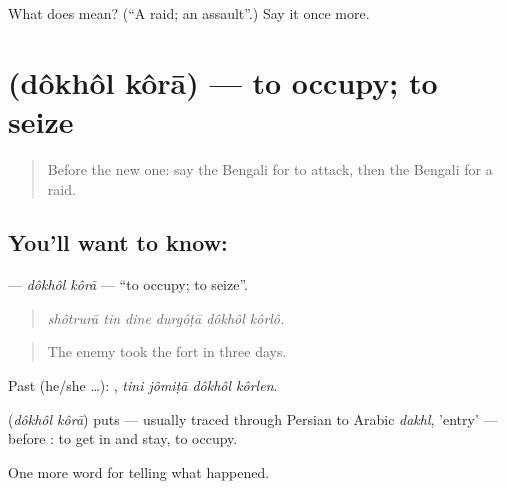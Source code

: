 \begin{tcolorbox}[breakable,colback=teal!4,colframe=teal!35!black,title={Before you move on}]
What does  mean? (\textquotedblleft{}A raid; an assault\textquotedblright{}.) Say it once more.
\end{tcolorbox}
\section[\texorpdfstring{\bn{দখল} \bn{করা} (dôkhôl kôrā)}{দখল করা (dôkhôl kôrā)}]{  (dôkhôl kôrā) — to occupy; to seize}

\label{lesson:BN-C314-dokhol-kora}



\begin{quote}
Before the new one: say the Bengali for to attack, then the Bengali for a raid.
\end{quote}

\subsection*{You'll want to know:  }
\textbf{ } — \emph{dôkhôl kôrā} — \textquotedblleft{}to occupy; to seize\textquotedblright{}.

\begin{quote}
     
\end{quote}

\begin{quote}
\emph{shôtrurā tin dine durgôṭā dôkhôl kôrlô.}
\end{quote}

\begin{quote}
The enemy took the fort in three days.
\end{quote}

Past (he/she …):    , \emph{tini jômiṭā dôkhôl kôrlen}.

\begin{cousinweb}
\textbf{ } (\emph{dôkhôl kôrā}) puts  — usually traced through Persian to Arabic \emph{dakhl}, 'entry' — before : to get in and stay, to occupy.
\end{cousinweb}

\begin{grammarlens}[title={What you've built}]
One more word for telling what happened.
\end{grammarlens}

